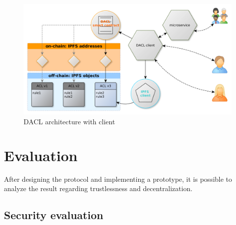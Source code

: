 \documentclass[12pt, conference]{IEEEtran}
\begin{document}
\newpage

\begin{figure}[!hb]
  \centering
  \includegraphics[width=\linewidth]{figures/eth-ipfs-design-with-client.png}
  \caption{DACL architecture with client}
  \label{fig:ipfs-design-with-client}
  \centering
\end{figure}


%



\section{Evaluation}

After designing the protocol and implementing a prototype, it is possible to analyze the result regarding trustlessness and decentralization.

\subsection{Security evaluation}
\end{document}
